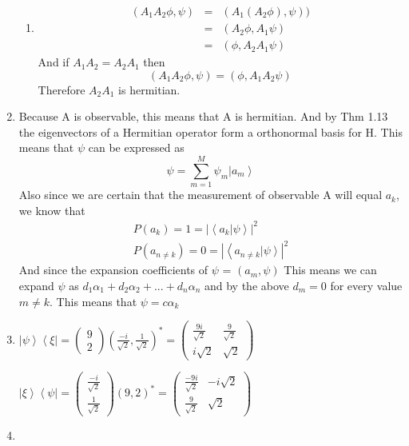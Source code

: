 \documentclass[11pt,fleqn]{article}
\begin{document}
\begin{enumerate}
\begin{enumerate}
\item 
\begin{eqnarray}
(A_{1}A_{2}\phi, \psi) &=& (A_{1}(A_{2}\phi), \psi))\\
&=& (A_{2}\phi, A_{1}\psi)\\
&=& (\phi, A_{2}A_{1}\psi) 
\end{eqnarray}
And if $A_{1}A_{2}=A_{2}A_{1}$ then 
\[
(A_{1}A_{2}\phi, \psi) = (\phi, A_{1}A_{2}\psi)
\]
Therefore $A_{2}A_{1}$ is hermitian. 
\end{enumerate}
\item %
Because A is observable, this means that A is hermitian. And by Thm 1.13 the eigenvectors of a Hermitian operator form a orthonormal basis for H. This means that $\psi$ can be expressed as 
\[
\psi = \sum_{m=1}^{M}{\psi_m}\left | a_{m} \right \rangle
\]
Also since we are certain that the measurement of observable A will equal $a_{k}$, we know that 
\begin{eqnarray}
P(a_{k})=1=| \left \langle a_{k} \right. \left | \psi \right \rangle |^{2} \\
P(a_{n\ne k})= 0 =| \left \langle a_{n\ne k} \right. \left | \psi \right \rangle |^{2}
\end{eqnarray}
And since the expansion coefficients of $\psi$ = $(a_{m},\psi)$ This means we can expand $\psi$ as $d_{1}\alpha_{1} + d_{2}\alpha_{2} + ... + d_{n} \alpha_{n}$ and by the above $d_{m} = 0$ for every value $m \ne k$. This means that $\psi = c\alpha_{k}$
\item %

$  \left | \psi \right \rangle \left \langle \xi \right.| =\begin{pmatrix}9 \\ 2\end{pmatrix} (\frac{-i}{\sqrt{2}} , \frac{1}{\sqrt{2}})^{*} = 
 \left( \begin{array}{cc}
\frac{9i}{\sqrt{2}} & \frac{9}{\sqrt{2}}  \\
i\sqrt{2} &\sqrt{2}  \end{array} \right)$

$ \left | \xi \right \rangle \left \langle \psi \right.| =\begin{pmatrix}\frac{-i}{\sqrt{2}} \\ \frac{1}{\sqrt{2}} \end{pmatrix} (9 , 2 )^{*} = 
 \left( \begin{array}{cc}
\frac{-9i}{\sqrt{2}} & -i\sqrt{2}  \\
\frac{9}{\sqrt{2}} & \sqrt{2}  \end{array} \right)$
\item %


\end{enumerate}
\end{document}
